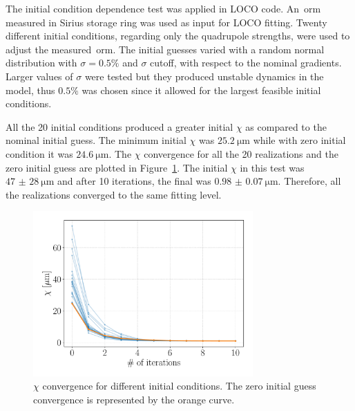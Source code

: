 The initial condition dependence test was applied in LOCO code. An~\gls{orm} measured in Sirius storage ring was used as input for LOCO fitting. Twenty different initial conditions, regarding only the quadrupole strengths, were used to adjust the measured~\gls{orm}. The initial guesses varied with a random normal distribution with $\sigma=0.5\%$ and $\sigma$ cutoff, with respect to the nominal gradients. Larger values of $\sigma$ were tested but they produced unstable dynamics in the model, thus $0.5\%$ was chosen since it allowed for the largest feasible initial conditions.

All the 20 initial conditions produced a greater initial $\chi$ as compared to the nominal initial guess. The minimum initial $\chi$ was $\SI{25.2}{\micro\meter}$ while with zero initial condition it was $\SI{24.6}{\micro\meter}$. The $\chi$ convergence for all the 20 realizations and the zero initial guess are plotted in Figure~\ref{fig:chi_ini_guess}. The initial $\chi$ in this test was $\SI{47(28)}{\micro\meter}$ and after 10 iterations, the final was $\SI{0.98(7)}{\micro\meter}$. Therefore, all the realizations converged to the same fitting level.
\begin{figure}
\centering
\includegraphics[width=0.75\textwidth]{figures/chi_convergence_initial_guess.pdf}
\caption{$\chi$ convergence for different initial conditions. The zero initial guess convergence is represented by the orange curve.}
\label{fig:chi_ini_guess}
\end{figure}

